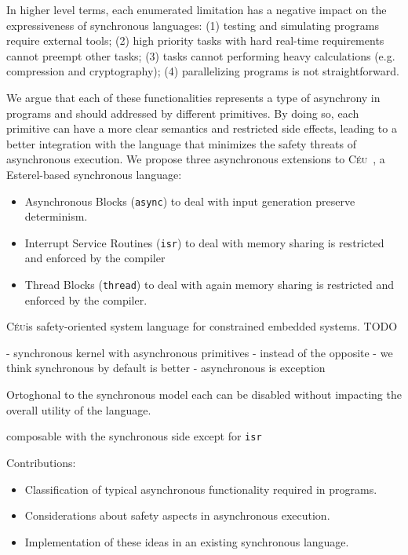 \documentclass[11pt,a4paper]{article}
\newcommand{\CEU}{\textsc{C\'{e}u}}
\newcommand{\code}[1] {{\small{\texttt{#1}}}}
\begin{document}
In higher level terms, each enumerated limitation has a negative impact on the 
expressiveness of synchronous languages:
%
(1) testing and simulating programs require external tools;
(2) high priority tasks with hard real-time requirements cannot preempt other 
        tasks;
(3) tasks cannot performing heavy calculations (e.g. compression and
        cryptography);
(4) parallelizing programs is not straightforward.

We argue that each of these functionalities represents a type of asynchrony in 
programs and should addressed by different primitives.
%
By doing so, each primitive can have a more clear semantics and restricted side 
effects, leading to a better integration with the language that minimizes the 
safety threats of asynchronous execution.
%
We propose three asynchronous extensions to \CEU~\cite{TODO}, a Esterel-based 
synchronous language:
%
\begin{itemize}
\item Asynchronous Blocks (\code{async}) to deal with input generation
preserve determinism.
\item Interrupt Service Routines (\code{isr}) to deal with
memory sharing is restricted and enforced by the compiler
\item Thread Blocks (\code{thread}) to deal with
again memory sharing is restricted and enforced by the compiler.
\end{itemize}

\CEU is safety-oriented system language for constrained embedded systems.
TODO

- synchronous kernel with asynchronous primitives
    - instead of the opposite
    - we think synchronous by default is better
    - asynchronous is exception

Ortoghonal to the synchronous model
each can be disabled without impacting the overall utility of the language.

composable with the synchronous side
except for \code{isr}

Contributions:
\begin{itemize}
\item Classification of typical asynchronous functionality required in 
programs.
\item Considerations about safety aspects in asynchronous execution.
\item Implementation of these ideas in an existing synchronous language.
\end{itemize}
\end{document}
